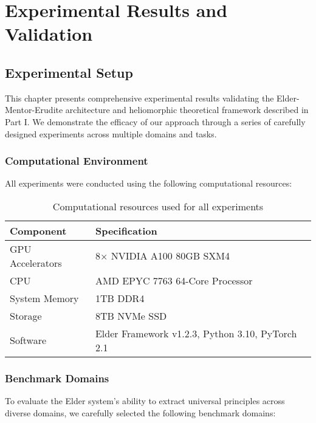 \chapter{Experimental Results and Validation}

\section{Experimental Setup}

This chapter presents comprehensive experimental results validating the Elder-Mentor-Erudite architecture and heliomorphic theoretical framework described in Part I. We demonstrate the efficacy of our approach through a series of carefully designed experiments across multiple domains and tasks.

\subsection{Computational Environment}

All experiments were conducted using the following computational resources:

\begin{table}[h]
\centering
\begin{tabular}{|l|l|}
\hline
\textbf{Component} & \textbf{Specification} \\
\hline
GPU Accelerators & 8× NVIDIA A100 80GB SXM4 \\
\hline
CPU & AMD EPYC 7763 64-Core Processor \\
\hline
System Memory & 1TB DDR4 \\
\hline
Storage & 8TB NVMe SSD \\
\hline
Software & Elder Framework v1.2.3, Python 3.10, PyTorch 2.1 \\
\hline
\end{tabular}
\caption{Computational resources used for all experiments}
\label{tab:computational_resources}
\end{table}

\subsection{Benchmark Domains}

To evaluate the Elder system's ability to extract universal principles across diverse domains, we carefully selected the following benchmark domains:

